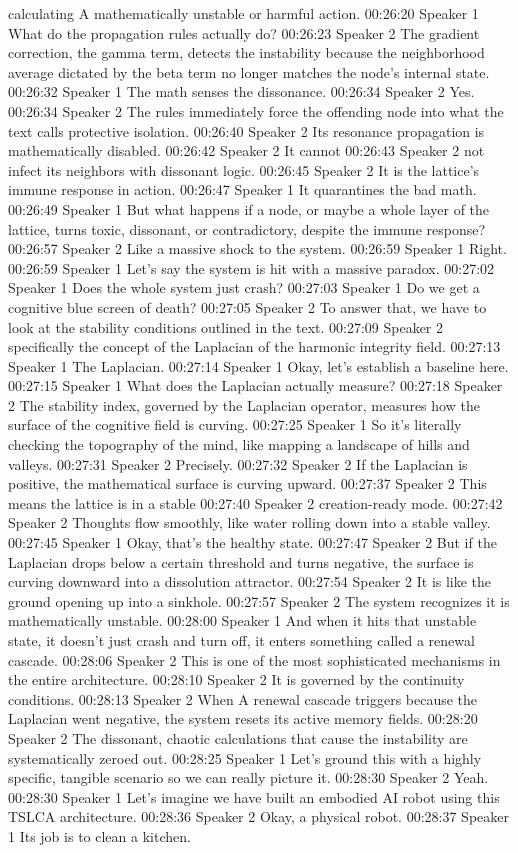 calculating A mathematically unstable or harmful action. 00:26:20 Speaker 1 What do the propagation rules actually do? 00:26:23 Speaker 2 The gradient correction, the gamma term, detects the instability because the neighborhood average dictated by the beta term no longer matches the node's internal state. 00:26:32 Speaker 1 The math senses the dissonance. 00:26:34 Speaker 2 Yes. 00:26:34 Speaker 2 The rules immediately force the offending node into what the text calls protective isolation. 00:26:40 Speaker 2 Its resonance propagation is mathematically disabled. 00:26:42 Speaker 2 It cannot 00:26:43 Speaker 2 not infect its neighbors with dissonant logic. 00:26:45 Speaker 2 It is the lattice's immune response in action. 00:26:47 Speaker 1 It quarantines the bad math. 00:26:49 Speaker 1 But what happens if a node, or maybe a whole layer of the lattice, turns toxic, dissonant, or contradictory, despite the immune response? 00:26:57 Speaker 2 Like a massive shock to the system. 00:26:59 Speaker 1 Right. 00:26:59 Speaker 1 Let's say the system is hit with a massive paradox. 00:27:02 Speaker 1 Does the whole system just crash? 00:27:03 Speaker 1 Do we get a cognitive blue screen of death? 00:27:05 Speaker 2 To answer that, we have to look at the stability conditions outlined in the text. 00:27:09 Speaker 2 specifically the concept of the Laplacian of the harmonic integrity field. 00:27:13 Speaker 1 The Laplacian. 00:27:14 Speaker 1 Okay, let's establish a baseline here. 00:27:15 Speaker 1 What does the Laplacian actually measure? 00:27:18 Speaker 2 The stability index, governed by the Laplacian operator, measures how the surface of the cognitive field is curving. 00:27:25 Speaker 1 So it's literally checking the topography of the mind, like mapping a landscape of hills and valleys. 00:27:31 Speaker 2 Precisely. 00:27:32 Speaker 2 If the Laplacian is positive, the mathematical surface is curving upward. 00:27:37 Speaker 2 This means the lattice is in a stable 00:27:40 Speaker 2 creation-ready mode. 00:27:42 Speaker 2 Thoughts flow smoothly, like water rolling down into a stable valley. 00:27:45 Speaker 1 Okay, that's the healthy state. 00:27:47 Speaker 2 But if the Laplacian drops below a certain threshold and turns negative, the surface is curving downward into a dissolution attractor. 00:27:54 Speaker 2 It is like the ground opening up into a sinkhole. 00:27:57 Speaker 2 The system recognizes it is mathematically unstable. 00:28:00 Speaker 1 And when it hits that unstable state, it doesn't just crash and turn off, it enters something called a renewal cascade. 00:28:06 Speaker 2 This is one of the most sophisticated mechanisms in the entire architecture. 00:28:10 Speaker 2 It is governed by the continuity conditions. 00:28:13 Speaker 2 When A renewal cascade triggers because the Laplacian went negative, the system resets its active memory fields. 00:28:20 Speaker 2 The dissonant, chaotic calculations that cause the instability are systematically zeroed out. 00:28:25 Speaker 1 Let's ground this with a highly specific, tangible scenario so we can really picture it. 00:28:30 Speaker 2 Yeah. 00:28:30 Speaker 1 Let's imagine we have built an embodied AI robot using this TSLCA architecture. 00:28:36 Speaker 2 Okay, a physical robot. 00:28:37 Speaker 1 Its job is to clean a kitchen. 